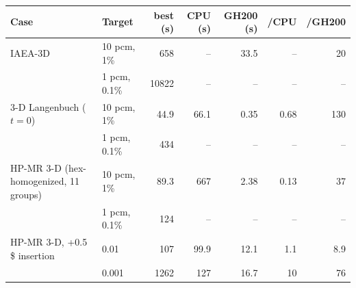 \begin{tabular}{llrrrrr}
\hline
Case & Target & \ffn{} best (s) & \garnet{} CPU (s) & \garnet{} GH200 (s) & \ffn{}/CPU & \ffn{}/GH200 \\
\hline
IAEA-3D & 10 pcm, 1\% & 658 & -- & 33.5 & -- & 20 \\
 & 1 pcm, 0.1\% & 10822 & -- & -- & -- & -- \\
\hline
3-D Langenbuch ($t=0$) & 10 pcm, 1\% & 44.9 & 66.1 & 0.35 & 0.68 & 130 \\
 & 1 pcm, 0.1\% & 434 & -- & -- & -- & -- \\
\hline
HP-MR 3-D (hex-homogenized, 11 groups) & 10 pcm, 1\% & 89.3 & 667 & 2.38 & 0.13 & 37 \\
 & 1 pcm, 0.1\% & 124 & -- & -- & -- & -- \\
\hline
HP-MR 3-D, +0.5\,\$ insertion & 0.01 & 107 & 99.9 & 12.1 & 1.1 & 8.9 \\
 & 0.001 & 1262 & 127 & 16.7 & 10 & 76 \\
\hline
\end{tabular}
